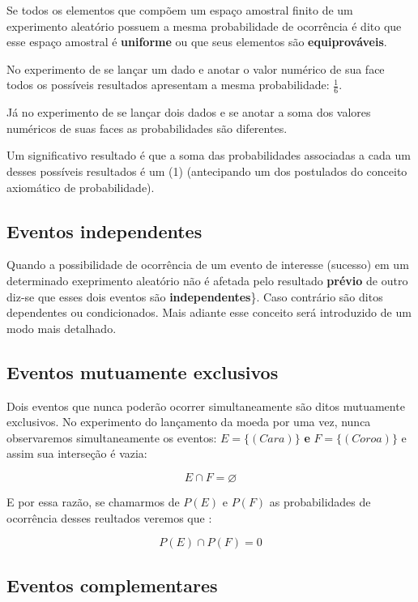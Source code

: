 \documentclass[
]{book}
\begin{document}
Se todos os elementos que compõem um espaço amostral finito de um experimento aleatório possuem a mesma probabilidade de ocorrência é dito que esse espaço amostral é \textbf{uniforme} ou que seus elementos são \textbf{equiprováveis}.

No experimento de se lançar um dado e anotar o valor numérico de sua face todos os possíveis resultados apresentam a mesma probabilidade: \(\frac{1}{6}\).

Já no experimento de se lançar dois dados e se anotar a soma dos valores numéricos de suas faces as probabilidades são diferentes.

Um significativo resultado é que a soma das probabilidades associadas a cada um desses possíveis resultados é um (1) (antecipando um dos postulados do conceito axiomático de probabilidade).

\hypertarget{eventos-independentes}{%
\subsection{Eventos independentes}\label{eventos-independentes}}

Quando a possibilidade de ocorrência de um evento de interesse (sucesso) em um determinado exeprimento aleatório não é afetada pelo resultado \textbf{prévio} de outro diz-se que esses dois eventos são \textbf{independentes}\}. Caso contrário são ditos dependentes ou condicionados. Mais adiante esse conceito será introduzido de um modo mais detalhado.

\hypertarget{eventos-mutuamente-exclusivos}{%
\subsection{Eventos mutuamente exclusivos}\label{eventos-mutuamente-exclusivos}}

Dois eventos que nunca poderão ocorrer simultaneamente são ditos mutuamente exclusivos. No experimento do lançamento da moeda por uma vez, nunca observaremos simultaneamente os eventos: \(E=\{(Cara)\}\) \textbf{e} \(F=\{(Coroa)\}\) e assim sua interseção é vazia:

\[
E \cap F = \varnothing 
\]

E por essa razão, se chamarmos de \(P(E)\) e \(P(F)\) as probabilidades de ocorrência desses reultados veremos que :

\[
P(E) \cap P(F) = 0
\]

\hypertarget{eventos-complementares}{%
\subsection{Eventos complementares}\label{eventos-complementares}}
\end{document}
